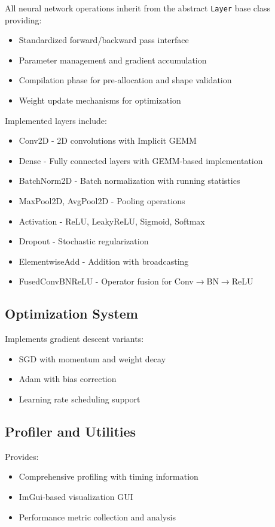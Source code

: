 \documentclass[12pt,oneside,a4paper]{report}
\begin{document}
All neural network operations inherit from the abstract \texttt{Layer} base class providing:
\begin{itemize}
    \item Standardized forward/backward pass interface
    \item Parameter management and gradient accumulation
    \item Compilation phase for pre-allocation and shape validation
    \item Weight update mechanisms for optimization
\end{itemize}

Implemented layers include:
\begin{itemize}
    \item Conv2D - 2D convolutions with Implicit GEMM
    \item Dense - Fully connected layers with GEMM-based implementation
    \item BatchNorm2D - Batch normalization with running statistics
    \item MaxPool2D, AvgPool2D - Pooling operations
    \item Activation - ReLU, LeakyReLU, Sigmoid, Softmax
    \item Dropout - Stochastic regularization
    \item ElementwiseAdd - Addition with broadcasting
    \item FusedConvBNReLU - Operator fusion for Conv$\rightarrow$BN$\rightarrow$ReLU
\end{itemize}

\subsection{Optimization System}

Implements gradient descent variants:
\begin{itemize}
    \item SGD with momentum and weight decay
    \item Adam with bias correction
    \item Learning rate scheduling support
\end{itemize}

\subsection{Profiler and Utilities}

Provides:
\begin{itemize}
    \item Comprehensive profiling with timing information
    \item ImGui-based visualization GUI
    \item Performance metric collection and analysis
\end{itemize}
\end{document}
